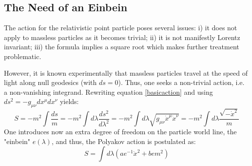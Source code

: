 \documentclass[twoside,a4paper,11pt]{article}
\numberwithin{equation}{section}
\begin{document}
\subsection{The Need of an Einbein}
\label{einbeinexplained}

The action for the relativistic point particle poses several issues: i) it does not apply to massless particles as it becomes trivial; ii) it is not manifestly Lorentz invariant; iii) the formula implies a square root which makes further treatment problematic.

However, it is known experimentally that massless particles travel at the speed of light along null geodesics (with $ds = 0$). Thus, one seeks a non-trivial action, i.e. a non-vanishing integrand. Rewriting equation \ref{basicaction} and using $ds^2 = - g_{\mu\nu} dx^{\mu} dx^{\nu}$ yields:
\begin{equation}
S = - m^2 \int \dfrac{ds}{m} = - m^2 \int d\lambda \dfrac{ds^2}{d\lambda^2} = -m^2 \int d\lambda \sqrt{g_{\mu\nu} \dot{x}^{\mu} \dot{x}^{\nu} } = - m^2 \int d\lambda \dfrac{\sqrt{-\dot{x}^2}}{m}
\label{beforeeinbeinaction}
\end{equation}
One introduces now an extra degree of freedom on the particle world line, the  "einbein" $e(\lambda)$, and thus, the Polyakov action is postulated as:
\begin{equation}
S = \int d\lambda \left( a e^{-1} \dot{x}^2 + b e m^2\right) 
\label{aftereinbeinaction}
\end{equation}
\end{document}
